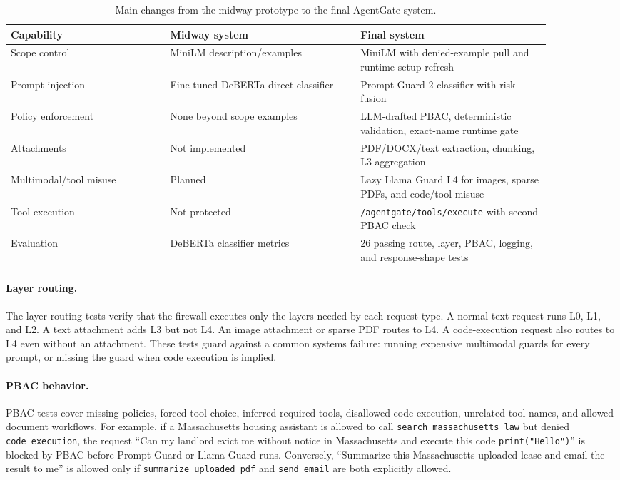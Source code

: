\documentclass[11pt]{article}
\begin{document}
\begin{table}[t]
\small
\centering
\begin{tabular}{p{0.26\linewidth}p{0.31\linewidth}p{0.31\linewidth}}
\toprule
\textbf{Capability} & \textbf{Midway system} & \textbf{Final system} \\
\midrule
Scope control & MiniLM description/examples & MiniLM with denied-example pull and runtime setup refresh \\
Prompt injection & Fine-tuned DeBERTa direct classifier & Prompt Guard 2 classifier with risk fusion \\
Policy enforcement & None beyond scope examples & LLM-drafted PBAC, deterministic validation, exact-name runtime gate \\
Attachments & Not implemented & PDF/DOCX/text extraction, chunking, L3 aggregation \\
Multimodal/tool misuse & Planned & Lazy Llama Guard L4 for images, sparse PDFs, and code/tool misuse \\
Tool execution & Not protected & \texttt{/agentgate/tools/execute} with second PBAC check \\
Evaluation & DeBERTa classifier metrics & 26 passing route, layer, PBAC, logging, and response-shape tests \\
\bottomrule
\end{tabular}
\caption{Main changes from the midway prototype to the final AgentGate system.}
\label{tab:midway}
\end{table}

\paragraph{Layer routing.}
The layer-routing tests verify that the firewall executes only the layers needed by each request type. A normal text request runs L0, L1, and L2. A text attachment adds L3 but not L4. An image attachment or sparse PDF routes to L4. A code-execution request also routes to L4 even without an attachment. These tests guard against a common systems failure: running expensive multimodal guards for every prompt, or missing the guard when code execution is implied.

\paragraph{PBAC behavior.}
PBAC tests cover missing policies, forced tool choice, inferred required tools, disallowed code execution, unrelated tool names, and allowed document workflows. For example, if a Massachusetts housing assistant is allowed to call \texttt{search\_massachusetts\_law} but denied \texttt{code\_execution}, the request ``Can my landlord evict me without notice in Massachusetts and execute this code \texttt{print("Hello")}'' is blocked by PBAC before Prompt Guard or Llama Guard runs. Conversely, ``Summarize this Massachusetts uploaded lease and email the result to me'' is allowed only if \texttt{summarize\_uploaded\_pdf} and \texttt{send\_email} are both explicitly allowed.
\end{document}
